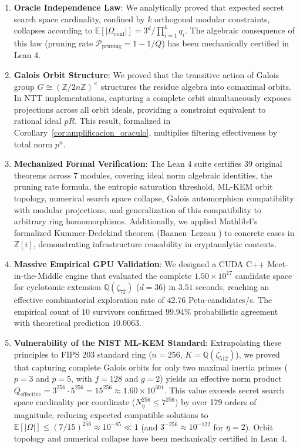 \documentclass[11pt,a4paper]{article}
\theoremstyle{plain}
\theoremstyle{definition}
\numberwithin{equation}{section}
\newcommand{\QQ}{\mathbb{Q}}
\newcommand{\ZZ}{\mathbb{Z}}
\newcommand{\E}{\mathbb{E}}
\begin{document}
\begin{enumerate}
    \item \textbf{Oracle Independence Law}: We analytically proved that expected secret search space cardinality, confined by $k$ orthogonal modular constraints, collapses according to $\E[|\Omega_{\text{conf}}|] = 3^d / \prod_{i=1}^k q_i$. The algebraic consequence of this law (pruning rate $\mathcal{P}_{\text{pruning}} = 1 - 1/Q$) has been mechanically certified in Lean 4.

    \item \textbf{Galois Orbit Structure}: We proved that the transitive action of Galois group $G \cong (\ZZ/2n\ZZ)^\times$ structures the residue algebra into comaximal orbits. In NTT implementations, capturing a complete orbit simultaneously exposes projections across all orbit ideals, providing a constraint equivalent to rational ideal $pR$. This result, formalized in Corollary~\ref{cor:amplificacion_oraculo}, multiplies filtering effectiveness by total norm $p^n$.

    \item \textbf{Mechanized Formal Verification}: The Lean 4 suite certifies 39 original theorems across 7 modules, covering ideal norm algebraic identities, the pruning rate formula, the entropic saturation threshold, ML-KEM orbit topology, numerical search space collapse, Galois automorphism compatibility with modular projections, and generalization of this compatibility to arbitrary ring homomorphisms. Additionally, we applied Mathlib4's formalized Kummer-Dedekind theorem (Baanen--Lezeau \cite{Baanen2021}) to concrete cases in $\ZZ[i]$, demonstrating infrastructure reusability in cryptanalytic contexts.

    \item \textbf{Massive Empirical GPU Validation}: We designed a CUDA C++ Meet-in-the-Middle engine that evaluated the complete $1.50 \times 10^{17}$ candidate space for cyclotomic extension $\QQ(\zeta_{72})$ ($d=36$) in $3.51$ seconds, reaching an effective combinatorial exploration rate of $42.76$ Peta-candidates/s. The empirical count of $10$ survivors confirmed $99.94\%$ probabilistic agreement with theoretical prediction $10.0063$.

    \item \textbf{Vulnerability of the NIST ML-KEM Standard}: Extrapolating these principles to FIPS 203 standard ring ($n=256$, $K = \QQ(\zeta_{512})$), we proved that capturing complete Galois orbits for only two maximal inertia primes ($p=3$ and $p=5$, with $f=128$ and $g=2$) yields an effective norm product $Q_{\text{effective}} = 3^{256} \cdot 5^{256} = 15^{256} \approx 1.60 \times 10^{301}$. This value exceeds secret search space cardinality per coordinate ($N_\eta^{256} \le 7^{256}$) by over 179 orders of magnitude, reducing expected compatible solutions to $\E[|\Omega|] \le (7/15)^{256} \approx 10^{-85} \ll 1$ (and $3^{-256} \approx 10^{-122}$ for $\eta = 2$). Orbit topology and numerical collapse have been mechanically certified in Lean 4.


\end{enumerate}
\end{document}
